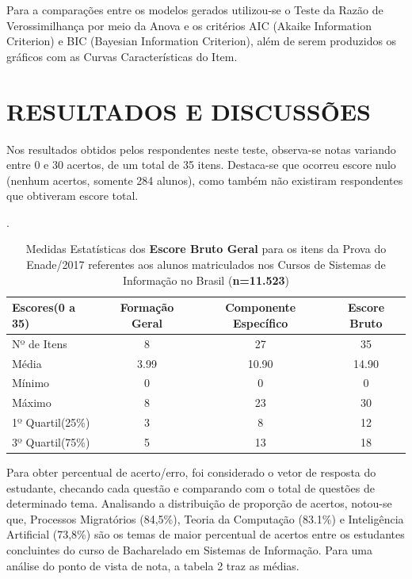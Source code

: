 \documentclass[12pt]{article}
\begin{document}
Para a comparações entre os modelos gerados utilizou-se o Teste da Razão de Verossimilhança por meio da Anova e os critérios AIC (Akaike Information Criterion) e BIC (Bayesian Information Criterion), além de serem produzidos os gráficos com as Curvas Características do Item.


\section{RESULTADOS E DISCUSSÕES}
  
Nos resultados obtidos pelos respondentes neste teste, observa-se notas variando entre 0 e 30 acertos, de um total de 35 itens. Destaca-se que ocorreu escore nulo (nenhum acertos, somente 284 alunos), como também não existiram respondentes que obtiveram escore total.  

\begin{table}[htb]
	\centering
	\caption{Medidas Estatísticas dos \textbf{Escore Bruto Geral} para os itens da Prova do Enade/2017 referentes aos alunos matriculados nos Cursos de Sistemas de Informação no Brasil (\textbf{n=11.523})}.
\begin{tabular}{l|c|c|c}
\hline\hline 
 Escores(0 a 35)  & Formação Geral      &  Componente Específico     & Escore Bruto   \\
\hline\hline
 Nº de Itens      & 8       &  27     &   35           \\
 Média            &  3.99   &  10.90  &   14.90        \\
 Mínimo           &  0      &  0      &   0            \\
 Máximo           &  8      &  23     &  30            \\
 1º Quartil(25\%) &  3      &  8      &   12           \\
 3º Quartil(75\%) &  5      &  13     &   18           \\
\hline\hline
\end{tabular}
\end{table}

\newpage
Para obter percentual de acerto/erro, foi considerado o vetor de resposta do estudante, checando cada questão e comparando com o total de questões de determinado tema. Analisando a distribuição de proporção de acertos, notou-se que, Processos Migratórios (84,5\%), Teoria da Computação (83.1\%) e Inteligência Artificial (73,8\%) são os temas de maior percentual de acertos entre os estudantes concluintes do curso de Bacharelado em Sistemas de Informação. Para uma análise do ponto de vista de nota, a tabela 2 traz as médias.
\end{document}
